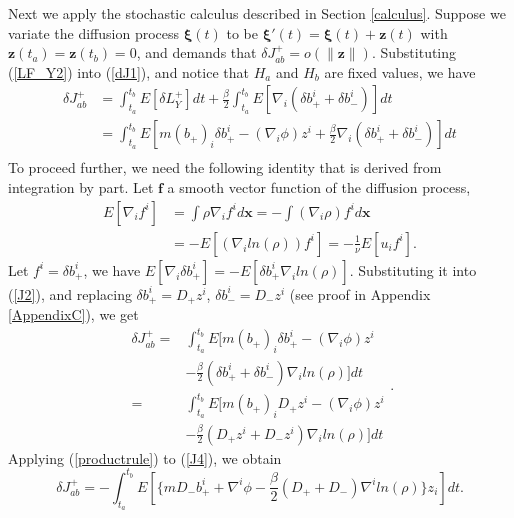 \documentclass[%
 aip, 
 amsmath,amssymb,amsthm,
 nofootinbib,
 reprint,
]{revtex4-1}
\begin{document}
Next we apply the stochastic calculus described in Section \ref{calculus}. Suppose we variate the diffusion process $\mathbf{\xi}(t)$ to be $\mathbf{\xi'}(t)=\mathbf{\xi}(t)+\mathbf{z}(t)$ with $\mathbf{z}(t_a)=\mathbf{z}(t_b)=0$, and demands that $\delta J_{ab}^+=o(\|\mathbf{z}\|)$. Substituting (\ref{LF_Y2}) into (\ref{dJ1}), and notice that $H_a$ and $H_b$ are fixed values, we have
\begin{equation}
\label{J2}
    \begin{split}
    \delta J_{ab}^+ &= \int_{t_a}^{t_b} E[\delta L_{Y}^+]dt + \frac{\beta}{2}\int_{t_a}^{t_b} E[\nabla_i(\delta b_+^i + \delta b_-^i)]dt\\
    & = \int_{t_a}^{t_b} E[m(b_+)_i\delta b_+^i -(\nabla_i\phi) z^i + \frac{\beta}{2}\nabla_i(\delta b_+^i + \delta b_-^i)]dt \\
    \end{split}
\end{equation}
To proceed further, we need the following identity that is derived from integration by part. Let $\mathbf{f}$ a smooth vector function of the diffusion process,
\begin{equation}
\label{id}
\begin{split}
    E[\nabla_i f^i]& =\int \rho\nabla_i f^i d\mathbf{x} 
    = - \int (\nabla_i\rho)f^i d\mathbf{x} \\
    &= - E[(\nabla_i ln(\rho)) f^i] = -\frac{1}{\nu}E[u_if^i].
    \end{split}
\end{equation}
Let $f^i=\delta b_+^i$, we have $E[\nabla_i \delta b_+^i]=- E[\delta b_+^i\nabla_i ln(\rho)]$. Substituting it into (\ref{J2}), and replacing $\delta b_+^i=D_+z^i$, $\delta b_-^i=D_-z^i$ (see proof in Appendix \ref{AppendixC}), we get
\begin{equation}
\label{J4}
    \begin{split}
    \delta J_{ab}^+ =& \int_{t_a}^{t_b} E[m(b_+)_i\delta b_+^i -(\nabla_i\phi) z^i \\
    &- \frac{\beta}{2} (\delta b_+^i + \delta b_-^i)\nabla_i ln(\rho)]dt \\
    =&\int_{t_a}^{t_b} E[m(b_+)_iD_+z^i -(\nabla_i\phi) z^i \\
    &-\frac{\beta}{2} (D_+z^i + D_-z^i)\nabla_i ln(\rho)]dt 
    \end{split}.
\end{equation}
Applying (\ref{productrule}) to (\ref{J4}), we obtain
\begin{equation}
\label{J5}
    \delta J_{ab}^+ = -\int_{t_a}^{t_b} E[\{mD_-b_+^i +\nabla^i\phi - \frac{\beta}{2}(D_+ + D_-)\nabla^i ln(\rho)\}z_i]dt.
\end{equation}
\end{document}
